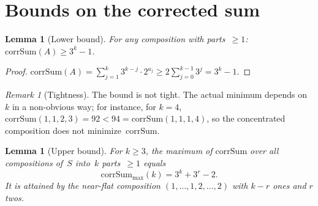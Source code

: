 \documentclass[11pt, a4paper]{amsart}
\theoremstyle{plain}
\newtheorem{lemma}[theorem]{Lemma}
\theoremstyle{definition}
\theoremstyle{remark}
\newtheorem{remark}[theorem]{Remark}
\newcommand{\corrSum}{\mathrm{corrSum}}
\begin{document}
\section{Bounds on the corrected sum}\label{sec:bounds}

\begin{lemma}[Lower bound]\label{lem:cs-min}
  For any composition with parts~$\geq 1$:
  $\corrSum(A) \geq 3^k - 1$.
\end{lemma}

\begin{proof}
  $\corrSum(A) = \sum_{j=1}^{k} 3^{k-j} \cdot 2^{a_j}
  \geq 2 \sum_{j=0}^{k-1} 3^{j} = 3^k - 1$.
\end{proof}

\begin{remark}[Tightness]\label{rem:lower-tight}
  The bound is not tight.  The actual minimum depends on~$k$
  in a non-obvious way; for instance, for $k = 4$,
  $\corrSum(1,1,2,3) = 92 < 94 = \corrSum(1,1,1,4)$,
  so the concentrated composition does not minimize~$\corrSum$.
\end{remark}

\begin{lemma}[Upper bound]\label{lem:cs-max}
  For $k \geq 3$, the maximum of $\corrSum$ over all
  compositions of~$S$ into~$k$ parts~$\geq 1$ equals
  \begin{equation}\label{eq:cs-max}
    \corrSum_{\max}(k) = 3^k + 3^r - 2.
  \end{equation}
  It is attained by the near-flat composition
  $(1, \ldots, 1, 2, \ldots, 2)$ with $k - r$ ones and $r$ twos.
\end{lemma}
\end{document}
